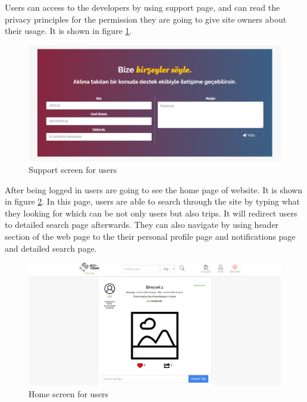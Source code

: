 Users can access to the developers by using support page, and can read the privacy principles for the permission they are going to give site owners about their usage. It is shown in figure  \ref{fig:supportWeb}. 

\begin{figure}[!htbp]
\centering
\includegraphics[width=\textwidth]{projectChapters/images/supportPage.png}
\caption{Support screen for users}
\label{fig:supportWeb}
\end{figure}

\newpage

After being logged in users are going to see the home page of website.  It is shown in figure  \ref{fig:homepageWeb}. In this page, users are able to search through the site by typing what they looking for which can be not only users but also trips. It will redirect users to detailed search page afterwards. They can also navigate by using header section of the web page to the their personal profile page and notifications page and detailed search page.

\begin{figure}[!htbp]
\centering
\includegraphics[width=\textwidth]{projectChapters/images/homepageWeb.png}
\caption{Home screen for users}
\label{fig:homepageWeb}
\end{figure}

